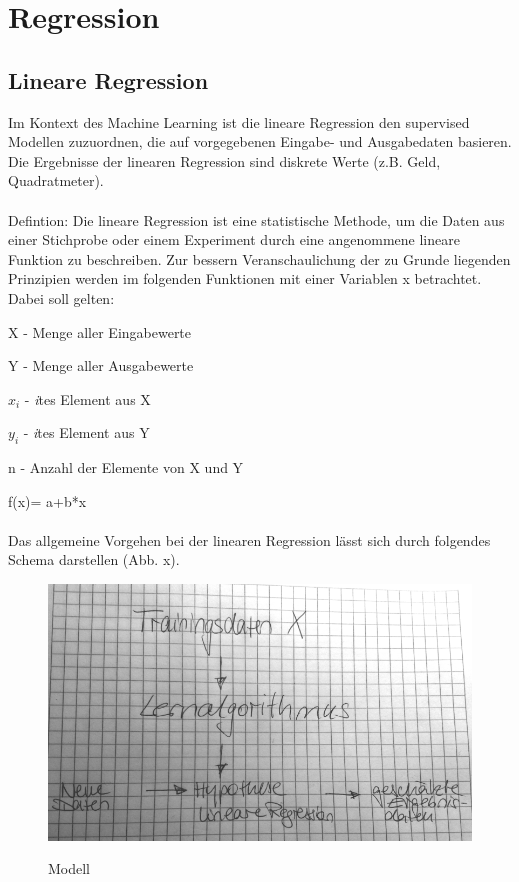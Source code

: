 \chapter{Regression}
\section{Lineare Regression}

Im Kontext des Machine Learning ist die lineare Regression den supervised Modellen zuzuordnen, die auf vorgegebenen Eingabe- und Ausgabedaten basieren. Die Ergebnisse der linearen Regression sind diskrete Werte (z.B. Geld, Quadratmeter).\\\\
Defintion: Die lineare Regression ist eine statistische Methode, um die Daten aus einer Stichprobe oder einem Experiment durch eine angenommene lineare Funktion zu beschreiben.
Zur bessern Veranschaulichung der zu Grunde liegenden Prinzipien werden im folgenden Funktionen mit einer Variablen x betrachtet. 
Dabei soll gelten:

X - Menge aller Eingabewerte

Y - Menge aller Ausgabewerte

$x_i$ - \textit{i}tes Element aus X

$y_i$ - \textit{i}tes Element aus Y

n - Anzahl der Elemente von X und Y

f(x)= a+b*x\\\\

Das allgemeine Vorgehen bei der linearen Regression lässt sich durch folgendes Schema darstellen (Abb. x).
\begin{figure}[htbp]
\centering
\includegraphics[scale=.2]{Abbildungen/Lineare_Regression/LinRegModell}
\label{Abb:Modell}
\caption{Modell}
\end{figure}

